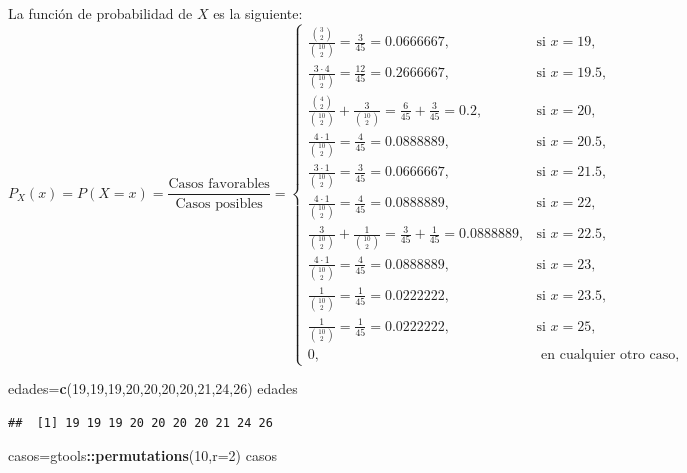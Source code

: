 \documentclass[
]{article}
\newenvironment{Shaded}{\begin{snugshade}}{\end{snugshade}}
\newcommand{\AttributeTok}[1]{\textcolor[rgb]{0.13,0.29,0.53}{#1}}
\newcommand{\DecValTok}[1]{\textcolor[rgb]{0.00,0.00,0.81}{#1}}
\newcommand{\FunctionTok}[1]{\textcolor[rgb]{0.13,0.29,0.53}{\textbf{#1}}}
\newcommand{\NormalTok}[1]{#1}
\newcommand{\OtherTok}[1]{\textcolor[rgb]{0.56,0.35,0.01}{#1}}
\newcommand{\SpecialCharTok}[1]{\textcolor[rgb]{0.81,0.36,0.00}{\textbf{#1}}}
\begin{document}
La función de probabilidad de \(X\) es la siguiente: \[
P_X(x)=P(X=x)=\frac{\mbox{Casos favorables}}{\mbox{Casos posibles}}=
\left\{\begin{array}{ll}
\frac{\binom{3}{2}}{\binom{10}{2}}=\frac{3}{45}=0.0666667, & \mbox{si } x=19,
 \\[0.25cm]
\frac{3\cdot 4}{\binom{10}{2}}=\frac{12}{45}=0.2666667, & \mbox{si } x=19.5,
 \\[0.25cm]
 \frac{\binom{4}{2}}{\binom{10}{2}}+\frac{3}{\binom{10}{2}}=\frac{6}{45}+\frac{3}{45}=0.2, & \mbox{si } x=20,
 \\[0.25cm]
 \frac{4\cdot 1}{\binom{10}{2}}=\frac{4}{45}=0.0888889, & \mbox{si } x=20.5,
 \\[0.25cm]
 \frac{3\cdot 1}{\binom{10}{2}}=\frac{3}{45}=0.0666667, & \mbox{si } x=21.5,
 \\[0.25cm]
 \frac{4\cdot 1}{\binom{10}{2}}=\frac{4}{45}=0.0888889, & \mbox{si } x=22,
 \\[0.25cm]
 \frac{3}{\binom{10}{2}}+\frac{1}{\binom{10}{2}}=\frac{3}{45}+\frac{1}{45}=0.0888889, & \mbox{si } x=22.5,
 \\[0.25cm]
 \frac{4\cdot 1}{\binom{10}{2}}=\frac{4}{45}=0.0888889, & \mbox{si } x=23,
 \\[0.25cm]
 \frac{1}{\binom{10}{2}}=\frac{1}{45}=0.0222222, & \mbox{si } x=23.5,
 \\[0.25cm]
 \frac{1}{\binom{10}{2}}=\frac{1}{45}=0.0222222, & \mbox{si } x=25,
 \\[0.25cm]
0, & \mbox{ en cualquier otro caso},
\end{array}\right.
\]

\begin{Shaded}
\begin{Highlighting}[]
\NormalTok{edades}\OtherTok{=}\FunctionTok{c}\NormalTok{(}\DecValTok{19}\NormalTok{,}\DecValTok{19}\NormalTok{,}\DecValTok{19}\NormalTok{,}\DecValTok{20}\NormalTok{,}\DecValTok{20}\NormalTok{,}\DecValTok{20}\NormalTok{,}\DecValTok{20}\NormalTok{,}\DecValTok{21}\NormalTok{,}\DecValTok{24}\NormalTok{,}\DecValTok{26}\NormalTok{)}
\NormalTok{edades}
\end{Highlighting}
\end{Shaded}

\begin{verbatim}
##  [1] 19 19 19 20 20 20 20 21 24 26
\end{verbatim}

\begin{Shaded}
\begin{Highlighting}[]
\NormalTok{casos}\OtherTok{=}\NormalTok{gtools}\SpecialCharTok{::}\FunctionTok{permutations}\NormalTok{(}\DecValTok{10}\NormalTok{,}\AttributeTok{r=}\DecValTok{2}\NormalTok{)}
\NormalTok{casos}
\end{Highlighting}
\end{Shaded}
\end{document}
